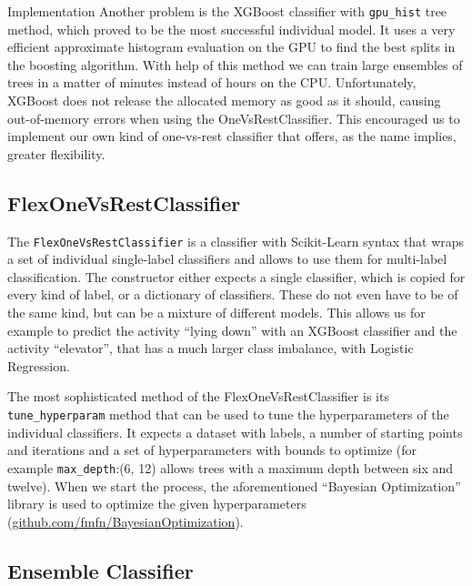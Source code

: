 \begin{section}{Implementation}
Another problem is the XGBoost classifier with \texttt{gpu\_hist} tree method, which proved to be the most successful individual model. It uses a very efficient approximate histogram evaluation on the GPU to find the best splits in the boosting algorithm. With help of this method we can train large ensembles of trees in a matter of minutes instead of hours on the CPU. Unfortunately, XGBoost does not release the allocated memory as good as it should, causing out-of-memory errors when using the OneVsRestClassifier.
This encouraged us to implement our own kind of one-vs-rest classifier that offers, as the name implies, greater flexibility. 

\subsection{FlexOneVsRestClassifier}

The \texttt{FlexOneVsRestClassifier} is a classifier with Scikit-Learn syntax that wraps a set of individual single-label classifiers and allows to use them for multi-label classification. The constructor either expects a single classifier, which is copied for every kind of label, or a dictionary of classifiers. These do not even have to be of the same kind, but can be a mixture of different models. This allows us for example to predict the activity \enquote{lying down} with an XGBoost classifier and the activity \enquote{elevator}, that has a much larger class imbalance, with Logistic Regression.

The most sophisticated method of the FlexOneVsRestClassifier is its \texttt{tune\_hyperparam} method that can be used to tune the hyperparameters of the individual classifiers. It expects a dataset with labels, a number of starting points and iterations and a set of hyperparameters with bounds to optimize (for example \texttt{max\_depth}:(6, 12) allows trees with a maximum depth between six and twelve). When we start the process, the aforementioned \enquote{Bayesian Optimization} library is used to optimize the given hyperparameters (\href{https://github.com/fmfn/BayesianOptimization}{github.com/fmfn/BayesianOptimization}). 

\subsection{Ensemble Classifier}


\end{section}
